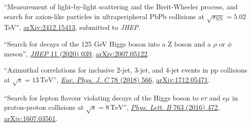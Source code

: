 \begin{description}[leftmargin=12pt,font=\normalfont\textit]
\begin{description}[leftmargin=12pt,font=\normalfont,labelsep=0em]
\item ``Measurement of light-by-light scattering and the Breit-Wheeler process, and search for axion-like particles in ultraperipheral PbPb collisions at $\sqrt{s_{\text{NN}}} = 5.02$ TeV'', \href{https://arxiv.org/abs/2412.15413}{arXiv:2412.15413}, submitted to \emph{JHEP}.
\item ``Search for decays of the 125 GeV Higgs boson into a Z boson and a $\rho$ or $\phi$ meson'', \href{https://doi.org/10.1007/JHEP11(2020)039}{\emph{JHEP} 11 (2020) 039}, \href{https://arxiv.org/abs/2007.05122}{arXiv:2007.05122}.
\item {} ``Azimuthal correlations for inclusive 2-jet, 3-jet, and 4-jet events in pp collisions at $\sqrt{s} = 13\,\text{TeV}$'', \href{http://dx.doi.org/10.1140/epjc/s10052-018-6033-4}{\emph{Eur. Phys. J. C} 78 (2018) 566}, \href{http://arxiv.org/abs/1712.05471}{arXiv:1712.05471}.
\item ``Search for lepton flavour violating decays of the Higgs boson to e$\tau$ and e$\mu$ in proton-proton collisions at $\sqrt{s} = 8\,\text{TeV}$'', \href{http://dx.doi.org/10.1016/j.physletb.2016.09.062}{\emph{Phys. Lett. B} 763 (2016) 472}, \href{http://arxiv.org/abs/1607.03561}{arXiv:1607.03561}.
\end{description}
\end{description}